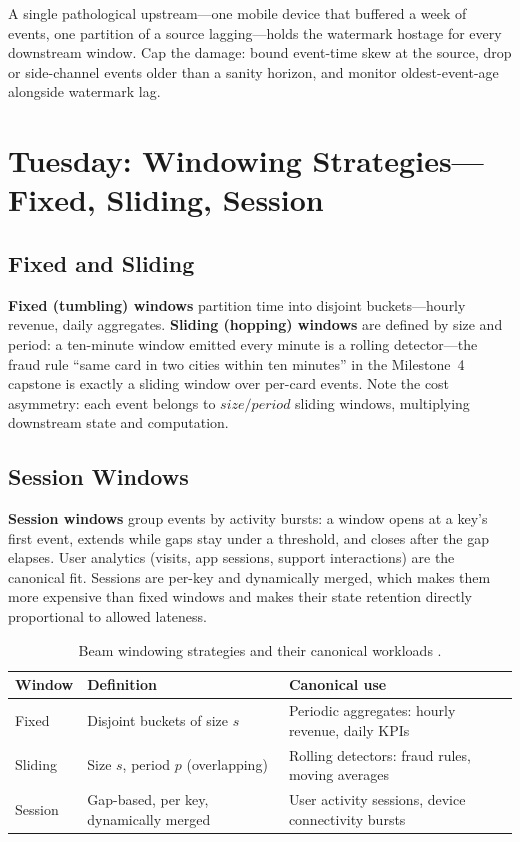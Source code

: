 \begin{pitfall}
A single pathological upstream---one mobile device that buffered a week of events, one partition of a source lagging---holds the watermark hostage for every downstream window. Cap the damage: bound event-time skew at the source, drop or side-channel events older than a sanity horizon, and monitor oldest-event-age alongside watermark lag.
\end{pitfall}

\section{Tuesday: Windowing Strategies---Fixed, Sliding, Session}

\subsection{Fixed and Sliding}
\textbf{Fixed (tumbling) windows} partition time into disjoint buckets---hourly revenue, daily aggregates. \textbf{Sliding (hopping) windows} are defined by size and period: a ten-minute window emitted every minute is a rolling detector---the fraud rule ``same card in two cities within ten minutes'' in the Milestone~4 capstone is exactly a sliding window over per-card events. Note the cost asymmetry: each event belongs to \(size / period\) sliding windows, multiplying downstream state and computation.

\subsection{Session Windows}
\textbf{Session windows} group events by activity bursts: a window opens at a key's first event, extends while gaps stay under a threshold, and closes after the gap elapses. User analytics (visits, app sessions, support interactions) are the canonical fit. Sessions are per-key and dynamically merged, which makes them more expensive than fixed windows and makes their state retention directly proportional to allowed lateness.

\begin{table}[H]
\centering
\small
\begin{tabular}{@{}p{2.6cm}p{4.2cm}p{5.6cm}@{}} \\
\toprule
\textbf{Window} & \textbf{Definition} & \textbf{Canonical use} \\
\midrule
Fixed & Disjoint buckets of size $s$ & Periodic aggregates: hourly revenue, daily KPIs \\
Sliding & Size $s$, period $p$ (overlapping) & Rolling detectors: fraud rules, moving averages \\
Session & Gap-based, per key, dynamically merged & User activity sessions, device connectivity bursts \\
\bottomrule
\end{tabular}
\caption{Beam windowing strategies and their canonical workloads \cite{apachebeamdocs}.}
\label{tab:ch15-windows}
\end{table}

